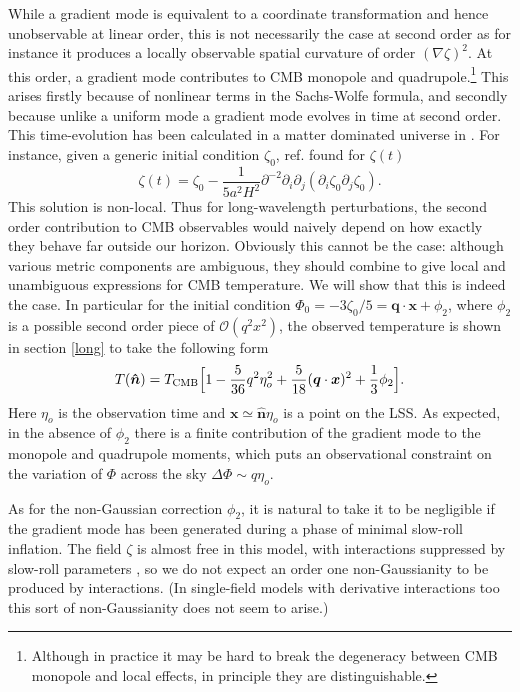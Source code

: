 \documentclass[12pt]{article}
\numberwithin{equation}{section}
\def\bsb{\boldsymbol}
\def\be{\begin{equation}}
\def\ee{\end{equation}}
\def\d{\partial}
\def\n{\bsb{\hat n}}
\def\O{\mathcal{O}}
\def\x{{\bsb x}}
\begin{document}
While a gradient mode is equivalent to a coordinate transformation and hence unobservable at linear order, this is not necessarily the case at second order as for instance it produces a locally observable spatial curvature of order $(\nabla\zeta)^2$. At this order, a gradient mode contributes to CMB  monopole and quadrupole.\footnote{Although in practice it may be hard to break the degeneracy between CMB monopole and local effects, in principle they are distinguishable.} This arises firstly because of nonlinear terms in the Sachs-Wolfe formula, and secondly because unlike a uniform mode a gradient mode evolves in time at second order. This time-evolution has been calculated in a matter dominated universe in \cite{Matarrese,Bartolo,Creminelli_action}. For instance, given a generic initial condition $\zeta_0$, ref. \cite{Creminelli_action} found for $\zeta(t)$ 
\be
\label{z(t)}
\zeta(t) =  \zeta_0-\frac{1}{5 a^2 H^2}\d^{-2}\d_i\d_j(\d_i\zeta_0\d_j\zeta_0).
\ee
This solution is non-local. Thus for long-wavelength perturbations, the second order contribution to CMB observables would naively depend on how exactly they behave far outside our horizon. Obviously this cannot be the case: although various metric components are ambiguous, they should combine to give local and unambiguous expressions for CMB temperature. We will show that this is indeed the case. In particular for the initial condition $\Phi_0=-3\zeta_0/5 = \bsb q\cdot \bsb x+\phi_2$, where $\phi_2$ is a possible second order piece of $\O(q^2 x^2)$, the observed temperature is shown in section \ref{long} to take the following form
\be\label{Tcmb}
T(\bsb{\hat n})
=T_{\rm CMB}\Big[1-\frac{5}{36}q^2\eta_o^2+\frac{5}{18}(\bsb q\cdot \bsb x)^2+\frac{1}{3}\phi_2\Big].
\ee
Here $\eta_o$ is the observation time and $\x\simeq \n \eta_o$ is a point on the LSS. As expected, in the absence of $\phi_2$ there is a finite contribution of the gradient mode to the monopole and quadrupole moments, which puts an observational constraint on the variation of $\Phi$ across the sky $\Delta\Phi \sim q \eta_o$. 

As for the non-Gaussian correction $\phi_2$, it is natural to take it to be negligible if the gradient mode has been generated during a phase of minimal slow-roll inflation. The field $\zeta$ is almost free in this model, with interactions suppressed by slow-roll parameters \cite{Maldacena}, so we do not expect an order one non-Gaussianity to be produced by interactions. (In single-field models with derivative interactions too this sort of non-Gaussianity does not seem to arise.)
\end{document}
